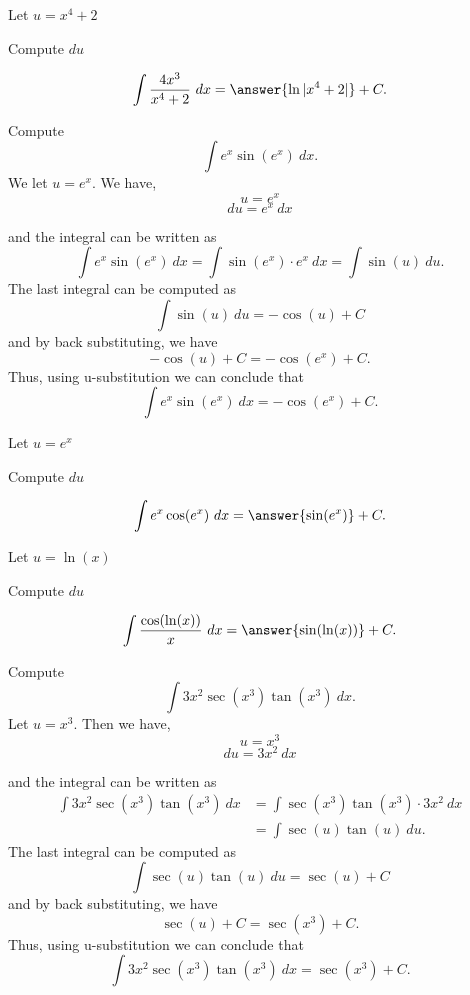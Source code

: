 \documentclass{ximera}
\begin{document}
\begin{problem}
\begin{hint}
Let $u = x^4 + 2$
\end{hint}
\begin{hint}
Compute $du$
\end{hint}
\[\int \frac{4x^3}{x^4 +2} \ dx = \answer{\ln|x^4 +2|} +C.\]
\end{problem}



\begin{example} Compute 
\[\int e^x\sin(e^x) \ dx.\]
We let $u = e^x$.  We have,
\[u = e^x\]
\[du = e^x \ dx\]

and the integral can be written as 
\[\int e^x\sin(e^x) \ dx = \int \sin(e^x) \cdot e^x \  dx = \int \sin(u) \ du.\]
The last integral can be computed as 
\[\int \sin(u) \ du = -\cos(u) + C\]
and by back substituting, we have 
\[-\cos(u) + C = -\cos(e^x) + C.\]
Thus, using u-substitution we can conclude that
\[\int e^x\sin(e^x) \ dx =  -\cos(e^x) + C.\]
\end{example}


\begin{problem}
\begin{hint}
Let $u = e^x$
\end{hint}
\begin{hint}
Compute $du$
\end{hint}
\[\int e^x\cos(e^x) \ dx = \answer{\sin(e^x)} +C.\]
\end{problem}

\begin{problem}
\begin{hint}
Let $u = \ln(x)$
\end{hint}
\begin{hint}
Compute $du$
\end{hint}
\[\int \frac{\cos(\ln(x))}{x} \ dx = \answer{\sin(\ln(x))} +C.\]
\end{problem}


\begin{example} Compute 
\[\int 3x^2\sec(x^3)\tan(x^3) \ dx.\]
Let $u = x^3$.  Then we have,
\[u = x^3\]
\[du = 3x^2 \ dx\]

and the integral can be written as 
\begin{align*}
\int 3x^2\sec(x^3)\tan(x^3) \ dx &= \int \sec(x^3)\tan(x^3) \cdot 3x^2 \ dx\\
&= \int \sec(u)\tan(u) \ du.
\end{align*}
The last integral can be computed as 
\[\int \sec(u)\tan(u) \ du = \sec(u) + C\]
and by back substituting, we have 
\[\sec(u) + C = \sec(x^3) + C.\]
Thus, using u-substitution we can conclude that
\[\int 3x^2\sec(x^3)\tan(x^3) \ dx =  \sec(x^3) + C.\]
\end{example}
\end{document}
